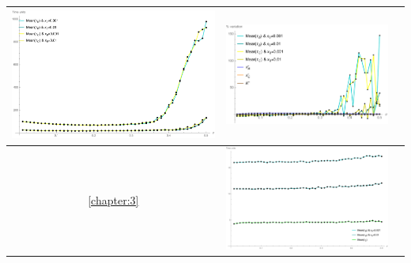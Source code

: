 \begin{table}[!htb]
\begin{tabular}{c|c|c}
\begin{minipage}{.45\textwidth}
			\includegraphics[width=\linewidth]{StopTime/2_meantauSP500H1500.pdf}
		\end{minipage}
		& \begin{minipage}{.45\textwidth}
			\includegraphics[width=\linewidth]{StopTime/2_varSP500H1500.pdf}
		\end{minipage}
		 \\ \hline
		\ref{chapter:3} & \begin{minipage}{.45\textwidth}
			\includegraphics[width=\linewidth]{StopTime/3_meantau.pdf}

\end{minipage}
\end{tabular}
\end{table}
